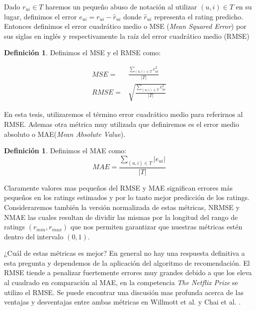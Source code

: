 \documentclass[hidelinks,12pt,a4paper]{book}
\providecommand{\abs}[1]{\lvert#1\rvert}
\theoremstyle{plain}
\theoremstyle{definition}
\newtheorem{definicion}[theorem]{Definición} %
\begin{document}
Dado $r_{ui} \in T$ haremos un pequeño abuso de notación al utilizar $(u,i) \in T$ en su lugar, definimos el error $e_{ui}=r_{ui}-\hat{r}_{ui}$	donde $\hat{r}_{ui}$ representa el rating predicho. Entonces definimos el error cuadrático medio o MSE (\textit{Mean Squared Error}) por sus siglas en inglés y respectivamente la raíz del error cuadrático medio (RMSE)

\begin{definicion}
Definimos el MSE y el RMSE como:

\begin{align}
  MSE =& \frac{\sum_{(u,i)\in T} e_{ui}^2}{|T|} \\
  RMSE =& \sqrt{\frac{\sum_{(u,i)\in T} e_{ui}^2}{|T|}}
\end{align}
\end{definicion}

En esta tesis, utilizaremos el  término error cuadrático medio para referirnos al RMSE. Ademas otra métrica muy utilizada que definiremos es el error medio absoluto o MAE(\textit{Mean Absolute Value}).

\begin{definicion}
Definimos el MAE como:
\begin{equation}
MAE = \frac{\sum_{(u,i)\in T} \abs{e_{ui}}}{|T|}
\end{equation} 
\end{definicion}

Claramente valores mas pequeños del RMSE y MAE significan errores más pequeños en los ratings estimados y por lo tanto mejor predicción de los ratings. Consideraremos también la versión normalizada de estas métricas, NRMSE y NMAE las cuales resultan de dividir las mismas por la longitud del rango de ratings $(r_{min},r_{max})$ que nos permiten garantizar que nuestras métricas estén dentro del intervalo $(0,1)$.

¿Cuál de estas métricas es mejor? En general no hay una respuesta definitiva a esta pregunta y dependemos de la aplicación del algoritmo de recomendación. El RMSE tiende a penalizar fuertemente errores muy grandes debido a que los eleva al cuadrado en comparación al MAE, en la competencia \textit{The Netflix Prize} se utilizo el RMSE\cite{bennett2007netflix}. Se puede encontrar una discusión mas profunda acerca de las ventajas y desventajas entre ambas métricas en Willmott et al. \cite{RMSEwillmott2005advantages} y Chai et al. \cite{RMSEchai2014root}.

\end{document}
